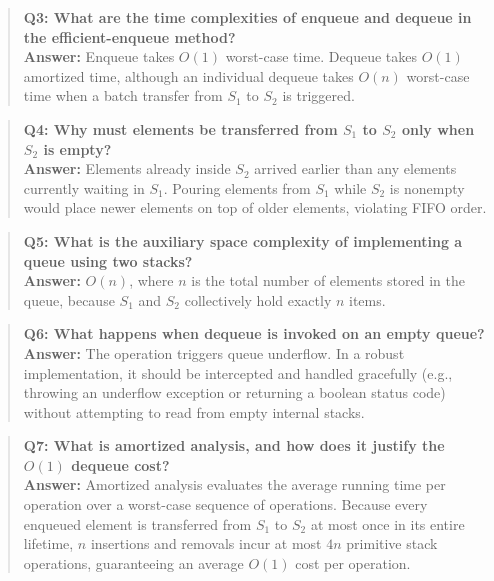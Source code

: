 \begin{quote}
\textbf{Q3: What are the time complexities of enqueue and dequeue in the efficient-enqueue method?}\\
\textbf{Answer:} Enqueue takes $O(1)$ worst-case time. Dequeue takes $O(1)$ amortized time, although an individual dequeue takes $O(n)$ worst-case time when a batch transfer from $S_1$ to $S_2$ is triggered.
\end{quote}

\begin{quote}
\textbf{Q4: Why must elements be transferred from $S_1$ to $S_2$ only when $S_2$ is empty?}\\
\textbf{Answer:} Elements already inside $S_2$ arrived earlier than any elements currently waiting in $S_1$. Pouring elements from $S_1$ while $S_2$ is nonempty would place newer elements on top of older elements, violating FIFO order.
\end{quote}

\begin{quote}
\textbf{Q5: What is the auxiliary space complexity of implementing a queue using two stacks?}\\
\textbf{Answer:} $O(n)$, where $n$ is the total number of elements stored in the queue, because $S_1$ and $S_2$ collectively hold exactly $n$ items.
\end{quote}

\begin{quote}
\textbf{Q6: What happens when dequeue is invoked on an empty queue?}\\
\textbf{Answer:} The operation triggers queue underflow. In a robust implementation, it should be intercepted and handled gracefully (e.g., throwing an underflow exception or returning a boolean status code) without attempting to read from empty internal stacks.
\end{quote}

\begin{quote}
\textbf{Q7: What is amortized analysis, and how does it justify the $O(1)$ dequeue cost?}\\
\textbf{Answer:} Amortized analysis evaluates the average running time per operation over a worst-case sequence of operations. Because every enqueued element is transferred from $S_1$ to $S_2$ at most once in its entire lifetime, $n$ insertions and removals incur at most $4n$ primitive stack operations, guaranteeing an average $O(1)$ cost per operation.
\end{quote}

